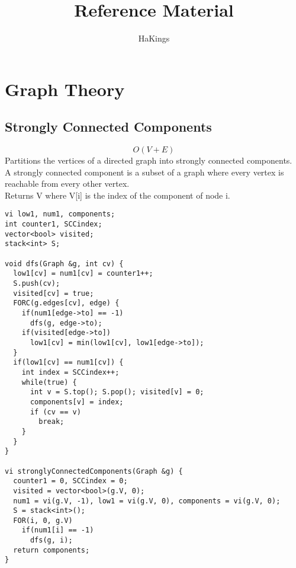\documentclass[11pt, oneside]{article}
\title{Reference Material}
\author{HaKings}
\date{}
\begin{document}
\maketitle
\newpage
\tableofcontents
\newpage

\section{Graph Theory}

\subsection{Strongly Connected Components}
\[O(V+E)\]
Partitions the vertices of a directed graph into strongly connected components.\\
A strongly connected component is a subset of a graph where every vertex is reachable from every other vertex.\\
Returns V where V[i] is the index of the component of node i.\\
\begin{lstlisting}
vi low1, num1, components;
int counter1, SCCindex;
vector<bool> visited;
stack<int> S;

void dfs(Graph &g, int cv) {
  low1[cv] = num1[cv] = counter1++;
  S.push(cv);
  visited[cv] = true;
  FORC(g.edges[cv], edge) {
    if(num1[edge->to] == -1)
      dfs(g, edge->to);
    if(visited[edge->to])
      low1[cv] = min(low1[cv], low1[edge->to]);        
  }
  if(low1[cv] == num1[cv]) {
    int index = SCCindex++;
    while(true) {
      int v = S.top(); S.pop(); visited[v] = 0;
      components[v] = index;
      if (cv == v)
        break;
    }
  }
}

vi stronglyConnectedComponents(Graph &g) {
  counter1 = 0, SCCindex = 0;
  visited = vector<bool>(g.V, 0);
  num1 = vi(g.V, -1), low1 = vi(g.V, 0), components = vi(g.V, 0);
  S = stack<int>();
  FOR(i, 0, g.V)
    if(num1[i] == -1)
      dfs(g, i);
  return components;
}
\end{lstlisting}
\end{document}
